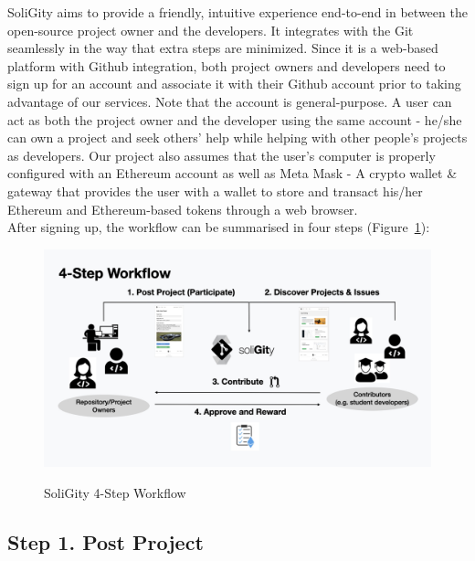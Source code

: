 \documentclass[12pt]{article}
\renewcommand{\_}{\kern-1.5pt\textunderscore\kern-1.5pt}
\begin{document}
SoliGity aims to provide a friendly, intuitive experience end-to-end in between the open-source project owner and the developers. It integrates with the Git seamlessly in the way that extra steps are minimized. Since it is a web-based platform with Github integration, both project owners and developers need to sign up for an account and associate it with their Github account prior to taking advantage of our services. Note that the account is general-purpose. A user can act as both the project owner and the developer using the same account - he/she can own a project and seek others’ help while helping with other people’s projects as developers. Our project also assumes that the user’s computer is properly configured with an Ethereum account as well as Meta Mask - A crypto wallet \& gateway that provides the user with a wallet to store and transact his/her Ethereum and Ethereum-based tokens through a web browser. \\

\noindent After signing up, the workflow can be summarised in four steps (Figure~\ref{fig:workflow1}):

\begin{figure}[h]
	\centering
	\includegraphics[width=16.5cm]{graphs/00a. workflow.jpeg}\\
	\caption{SoliGity 4-Step Workflow}
	\label{fig:workflow1}
\end{figure}


\subsection*{Step 1. Post Project}
\end{document}
